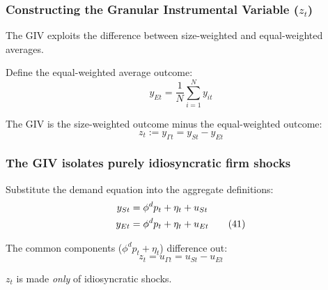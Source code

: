 \documentclass[aspectratio=169,11pt]{beamer}
\begin{document}
\begin{frame}
    \frametitle{Constructing the Granular Instrumental Variable ($z_t$)}

    \vspace{0.5cm}
    {\Large
        The GIV exploits the difference between size-weighted and equal-weighted averages.
    }

    \vspace{1cm}
    Define the equal-weighted average outcome:
    \begin{equation*}
        y_{Et} = \frac{1}{N} \sum_{i=1}^N y_{it}
    \end{equation*}

    \vspace{0.5cm}
    The GIV is the size-weighted outcome minus the equal-weighted outcome:
    \begin{equation}
        z_t := y_{\Gamma t} = y_{St} - y_{Et} \tag{40}
    \end{equation}

\end{frame}

\begin{frame}
    \frametitle{The GIV isolates purely idiosyncratic firm shocks}

    \vspace{0.5cm}
    Substitute the demand equation into the aggregate definitions:
    \begin{align}
        y_{St} & = \phi^d p_t + \eta_t + u_{St} \notag   \\
        y_{Et} & = \phi^d p_t + \eta_t + u_{Et} \tag{41}
    \end{align}

    \vspace{0.5cm}
    The common components ($\phi^d p_t + \eta_t$) difference out:
    \begin{equation}
        z_t = u_{\Gamma t} = u_{St} - u_{Et} \tag{42}
    \end{equation}

    \vspace{0.5cm}
    {\Large
        $z_t$ is made \emph{only} of idiosyncratic shocks.
    }

\end{frame}
\end{document}
